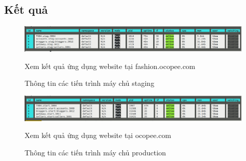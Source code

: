 \subsection{Kết quả}
\begin{figure}[h!]
	\begin{center}	
		\includegraphics[width=\textwidth]{./results/vps-staging}
		\caption{Thông tin các tiến trình máy chủ staging}
	\end{center}
Xem kết quả ứng dụng website tại fashion.ocopee.com
\end{figure}


\begin{figure}[h!]
	\begin{center}	
		\includegraphics[width=\textwidth]{./results/vps-production}
		\caption{Thông tin các tiến trình máy chủ production}
	\end{center}
Xem kết quả ứng dụng website tại ocopee.com
\end{figure}

